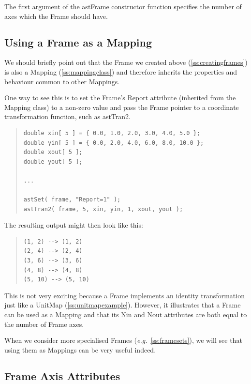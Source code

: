 \documentclass[twoside,11pt]{article}
\newcommand{\htmlref}[2]{#1}
\newcommand{\secref}[1]{\S\ref{#1}}
\renewcommand{\secref}[1]{\ref{#1}}
\begin{document}
The first argument of the \htmlref{astFrame}{astFrame} constructor function specifies the
number of axes which the Frame should have.

\subsection{\label{ss:frameasmapping}Using a Frame as a Mapping}

We should briefly point out that the \htmlref{Frame}{Frame} we created above
(\secref{ss:creatingframes}) is also a \htmlref{Mapping}{Mapping}
(\secref{ss:mappingclass}) and therefore inherits the properties and
behaviour common to other Mappings.

One way to see this is to set the Frame's \htmlref{Report}{Report} attribute (inherited
from the Mapping class) to a non-zero value and pass the Frame pointer
to a coordinate transformation function, such as \htmlref{astTran2}{astTran2}.

\begin{quote}
\small
\begin{verbatim}
double xin[ 5 ] = { 0.0, 1.0, 2.0, 3.0, 4.0, 5.0 };
double yin[ 5 ] = { 0.0, 2.0, 4.0, 6.0, 8.0, 10.0 };
double xout[ 5 ];
double yout[ 5 ];

...

astSet( frame, "Report=1" );
astTran2( frame, 5, xin, yin, 1, xout, yout );
\end{verbatim}
\normalsize
\end{quote}

The resulting output might then look like this:

\begin{quote}
\begin{verbatim}
(1, 2) --> (1, 2)
(2, 4) --> (2, 4)
(3, 6) --> (3, 6)
(4, 8) --> (4, 8)
(5, 10) --> (5, 10)
\end{verbatim}
\end{quote}

This is not very exciting because a Frame implements an identity
transformation just like a \htmlref{UnitMap}{UnitMap}
(\secref{ss:unitmapexample}). However, it illustrates that a Frame can
be used as a Mapping and that its \htmlref{Nin}{Nin} and \htmlref{Nout}{Nout} attributes are both
equal to the number of Frame axes.

When we consider more specialised Frames
({\em{e.g.}}~\secref{ss:framesets}), we will see that using them as
Mappings can be very useful indeed.

\subsection{\label{ss:frameaxisattributes}Frame Axis Attributes}
\end{document}
